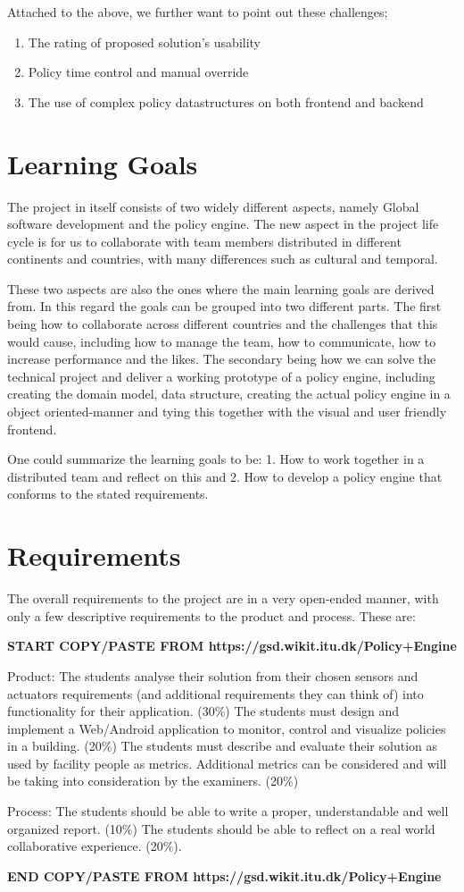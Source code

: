 Attached to the above, we further want to point out these challenges;
\begin{enumerate}
	\item The rating of proposed solution's usability
	\item Policy time control and manual override
	\item The use of complex policy datastructures on both frontend and backend
\end{enumerate}

\section{Learning Goals}
The project in itself consists of two widely different aspects, namely Global software development and the policy engine. The new aspect in the project life cycle is for us to collaborate with team members distributed in different continents and countries, with many differences such as cultural and temporal.

These two aspects are also the ones where the main learning goals are derived from. In this regard the goals can be grouped into two different parts. The first being how to collaborate across different countries and the challenges that this would cause, including how to manage the team, how to communicate, how to increase performance and the likes. The secondary being how we can solve the technical project and deliver a working prototype of a policy engine, including creating the domain model, data structure, creating the actual policy engine in a object oriented-manner and tying this together with the visual and user friendly frontend.

One could summarize the learning goals to be: 1. How to work together in a distributed team and reflect on this and 2. How to develop a policy engine that conforms to the stated requirements.

\section{Requirements}
The overall requirements to the project are in a very open-ended manner, with only a few descriptive requirements to the product and process. These are:

\textbf{START COPY/PASTE FROM https://gsd.wikit.itu.dk/Policy+Engine}

Product:
The students analyse their solution from their chosen sensors and actuators requirements (and additional requirements they can think of) into functionality for their application. (30\%)
The students must design and implement a Web/Android application to monitor, control and visualize policies in a building. (20\%)
The students must describe and evaluate their solution as used by facility people as metrics. Additional metrics can be considered and will be taking into consideration by the examiners. (20\%)

Process:
The students should be able to write a proper, understandable and well organized report. (10\%)
The students should be able to reflect on a real world collaborative experience. (20\%).

\textbf{END COPY/PASTE FROM https://gsd.wikit.itu.dk/Policy+Engine}

